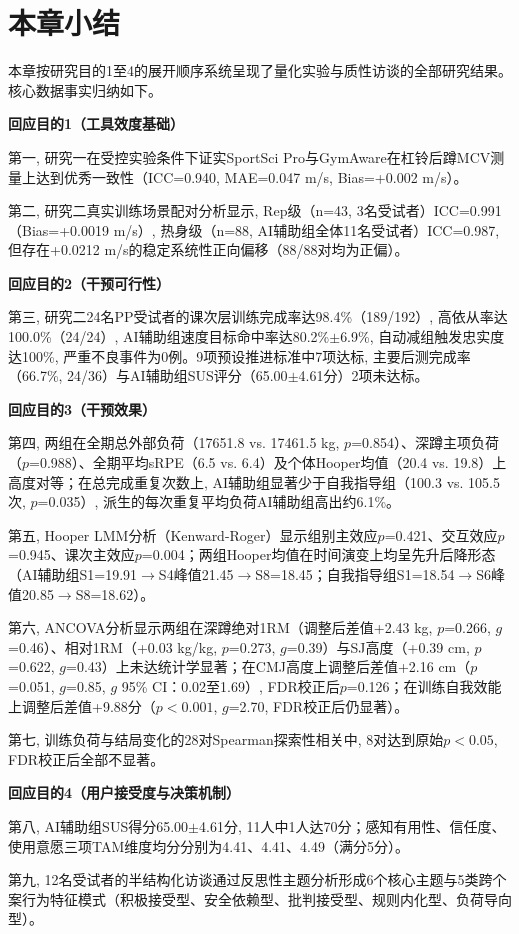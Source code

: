 \section{本章小结}
\label{sec:ch4_summary}

本章按研究目的1至4的展开顺序系统呈现了量化实验与质性访谈的全部研究结果。核心数据事实归纳如下。

\textbf{回应目的1（工具效度基础）}

第一, 研究一在受控实验条件下证实SportSci Pro与GymAware在杠铃后蹲MCV测量上达到优秀一致性（ICC=0.940, MAE=0.047 m/s, Bias=+0.002 m/s）。

第二, 研究二真实训练场景配对分析显示, Rep级（n=43, 3名受试者）ICC=0.991（Bias=+0.0019 m/s）, 热身级（n=88, AI辅助组全体11名受试者）ICC=0.987, 但存在+0.0212 m/s的稳定系统性正向偏移（88/88对均为正偏）。

\textbf{回应目的2（干预可行性）}

第三, 研究二24名PP受试者的课次层训练完成率达98.4\%（189/192）, 高依从率达100.0\%（24/24）, AI辅助组速度目标命中率达80.2\%$\pm$6.9\%, 自动减组触发忠实度达100\%, 严重不良事件为0例。9项预设推进标准中7项达标, 主要后测完成率（66.7\%, 24/36）与AI辅助组SUS评分（65.00$\pm$4.61分）2项未达标。

\textbf{回应目的3（干预效果）}

第四, 两组在全期总外部负荷（17651.8 vs. 17461.5 kg, $p$=0.854）、深蹲主项负荷（$p$=0.988）、全期平均sRPE（6.5 vs. 6.4）及个体Hooper均值（20.4 vs. 19.8）上高度对等；在总完成重复次数上, AI辅助组显著少于自我指导组（100.3 vs. 105.5次, $p$=0.035）, 派生的每次重复平均负荷AI辅助组高出约6.1\%。

第五, Hooper LMM分析（Kenward-Roger）显示组别主效应$p$=0.421、交互效应$p$=0.945、课次主效应$p$=0.004；两组Hooper均值在时间演变上均呈先升后降形态（AI辅助组S1=19.91$\to$S4峰值21.45$\to$S8=18.45；自我指导组S1=18.54$\to$S6峰值20.85$\to$S8=18.62）。

第六, ANCOVA分析显示两组在深蹲绝对1RM（调整后差值+2.43 kg, $p$=0.266, $g$=0.46）、相对1RM（+0.03 kg/kg, $p$=0.273, $g$=0.39）与SJ高度（+0.39 cm, $p$=0.622, $g$=0.43）上未达统计学显著；在CMJ高度上调整后差值+2.16 cm（$p$=0.051, $g$=0.85, $g$ 95\% CI：0.02至1.69）, FDR校正后$p$=0.126；在训练自我效能上调整后差值+9.88分（$p<0.001$, $g$=2.70, FDR校正后仍显著）。

第七, 训练负荷与结局变化的28对Spearman探索性相关中, 8对达到原始$p<0.05$, FDR校正后全部不显著。

\textbf{回应目的4（用户接受度与决策机制）}

第八, AI辅助组SUS得分65.00$\pm$4.61分, 11人中1人达70分；感知有用性、信任度、使用意愿三项TAM维度均分分别为4.41、4.41、4.49（满分5分）。

第九, 12名受试者的半结构化访谈通过反思性主题分析形成6个核心主题与5类跨个案行为特征模式（积极接受型、安全依赖型、批判接受型、规则内化型、负荷导向型）。
